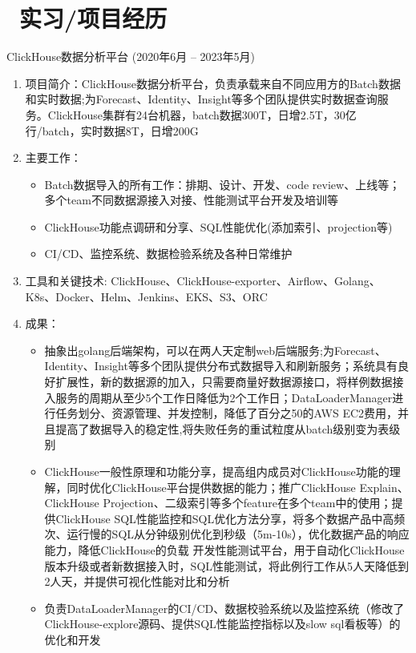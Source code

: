 \documentclass{resume}
\begin{document}
\section{\faUsers\ 实习/项目经历}
ClickHouse数据分析平台 (2020年6月 -- 2023年5月)
\begin{enumerate}
  \item 项目简介：ClickHouse数据分析平台，负责承载来自不同应用方的Batch数据和实时数据;为Forecast、Identity、Insight等多个团队提供实时数据查询服务。ClickHouse集群有24台机器，batch数据300T，日增2.5T，30亿行/batch，实时数据8T，日增200G
  \item 主要工作：
    \begin{itemize}
      \item Batch数据导入的所有工作：排期、设计、开发、code review、上线等；多个team不同数据源接入对接、性能测试平台开发及培训等
      \item ClickHouse功能点调研和分享、SQL性能优化(添加索引、projection等)
      \item CI/CD、监控系统、数据检验系统及各种日常维护
    \end{itemize}
  \item 工具和关键技术: ClickHouse、ClickHouse-exporter、Airflow、Golang、K8s、Docker、Helm、Jenkins、EKS、S3、ORC
  \item 成果：
    \begin{itemize}
      \item 抽象出golang后端架构，可以在两人天定制web后端服务;为Forecast、Identity、Insight等多个团队提供分布式数据导入和刷新服务；系统具有良好扩展性，新的数据源的加入，只需要商量好数据源接口，将样例数据接入服务的周期从至少5个工作日降低为2个工作日；DataLoaderManager进行任务划分、资源管理、并发控制，降低了百分之50的AWS EC2费用，并且提高了数据导入的稳定性,将失败任务的重试粒度从batch级别变为表级别
      \item ClickHouse一般性原理和功能分享，提高组内成员对ClickHouse功能的理解，同时优化ClickHouse平台提供数据的能力；推广ClickHouse Explain、ClickHouse Projection、二级索引等多个feature在多个team中的使用；提供ClickHouse SQL性能监控和SQL优化方法分享，将多个数据产品中高频次、运行慢的SQL从分钟级别优化到秒级（5m-10s），优化数据产品的响应能力，降低ClickHouse的负载
      开发性能测试平台，用于自动化ClickHouse版本升级或者新数据接入时，SQL性能测试，将此例行工作从5人天降低到2人天，并提供可视化性能对比和分析
      \item 负责DataLoaderManager的CI/CD、数据校验系统以及监控系统（修改了ClickHouse-explore源码、提供SQL性能监控指标以及slow sql看板等）的优化和开发
    \end{itemize}
\end{enumerate}
\end{document}
